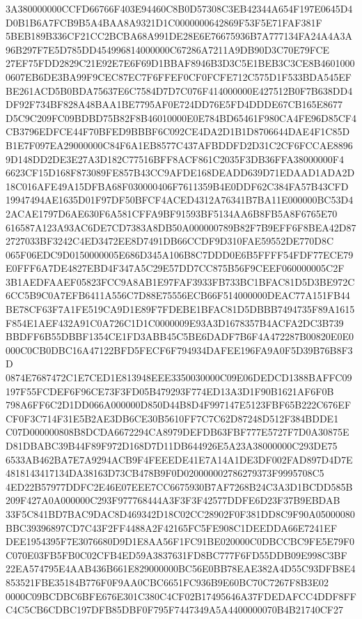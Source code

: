 \documentclass[UTF8,fontset=fandol,zihao=-4,a4paper]{ctexart}
\begin{document}
{{3A380000000CCFD66766F403E94460C8B0D57308C3EB42344A654F197E0645D4D0B1B6A7FCB9B5A4BAA8A9321D1C0000000642869F53F5E71FAF381F
5BEB189B336CF21CC2BCBA68A991DE28E6E76675936B7A777134FA24A4A3A96B297F7E5D785DD454996814000000C67286A7211A9DB90D3C70E79FCE
27EF75FDD2829C21E92E7E6F69D1BBAF8946B3D3C5E1BEB3C3CE8B46010000607EB6DE3BA99F9CEC87EC7F6FFEF0CF0FCFE712C575D1F533BDA545EF
BE261ACD5B0BDA75637E6C7584D7D7C076F414000000E427512B0F7B638DD4DF92F734BF828A48BAA1BE7795AF0E724DD76E5FD4DDDE67CB165E8677
D5C9C209FC09BDBD75B82F8B46010000E0E784BD65461F980CA4FE96D85CF4CB3796EDFCE44F70BFED9BBBF6C092CE4DA2D1B1D8706644DAE4F1C85D
B1E7F097EA29000000C84F6A1EB8577C437AFBDDFD2D31C2CF6FCCAE88969D148DD2DE3E27A3D182C77516BFF8ACF861C2035F3DB36FFA38000000F4
6623CF15D168F873089FE857B43CC9AFDE168DEADD639D71EDAAD1ADA2D18C016AFE49A15DFBA68F030000406F7611359B4E0DDF62C384FA57B43CFD
19947494AE1635D01F97DF50BFCF4ACED4312A76341B7BA11E000000BC53D42ACAE1797D6AE630F6A581CFFA9BF91593BF5134AA6B8FB5A8F6765E70
616587A123A93AC6DE7CD7383A8DB50A000000789B82F7B9EFF6F8BEA42D872727033BF3242C4ED3472EE8D7491DB66CCDF9D310FAE59552DE770D8C
065F06EDC9D0150000005E686D345A106B8C7DDD0E6B5FFFF54FDF77ECE79E0FFF6A7DE4827EBD4F347A5C29E57DD7CC875B56F9CEEF060000005C2F
3B1AEDFAAEF05823FCC9A8AB1E97FAF3933FB733BC1BFAC81D5D3BE972C6CC5B9C0A7EFB6411A556C7D88E75556ECB66F514000000DEAC77A151FB44
BE78CF63F7A1FE519CA9D1E89F7FDEBE1BFAC81D5DBBB7494735F89A1615F854E1AEF432A91C0A726C1D1C0000009E93A3D1678357B4ACFA2DC3B739
BBDFF6B55DBBF1354CE1FD3ABB45C5BE6DADF7B6F4A472287B00820E0E0000C0CB0DBC16A47122BFD5FECF6F794934DAFEE196FA9A0F5D39B76B8F3D
0874E7687472C1E7CED1E813948EEE3350030000C09E06DEDCD1388BAFFC09197F55FCDEF6F96CE73F3FD05B479293F774ED13A3D1F90B1621AF6F0B
798A6FF6C2D1DD066A000000D850D44B8D4F997147E5123FBF65B222C676EFCF0F3C714F31E5B2AE3DB6CE30B5610FF7C7C62D87248D512F384BDDE1
C07D000000808B8DCDA6672294CA8979DEFDB63FBF777E5727F7D0A30875ED81DBABC39B44F89F972D168D7D11DB644926E5A23A38000000C293DE75
6533AB462BA7E7A9294ACB9F4FEEEDE41E7A14A1DE3DF002FAD897D4D7E4818143417134DA38163D73CB478B9F0D020000002786279373F9995708C5
4ED22B57977DDFC2E46E07EEE7CC6675930B7AF7268B24C3A3D1BCDD585B209F427A0A000000C293F977768444A3F3F3F42577DDFE6D23F37B9EBDAB
33F5C841BD7BAC9DAC8D469342D18C02CC28902F0F381DD8C9F90A05000080BBC39396897CD7C43F2FF4488A2F42165FC5FE908C1DEEDDA66E7241EF
DEE1954395F7E3076680D9D1E8AA56F1FC91BE020000C0DBCCBC9FE5E79F0C070E03FB5FB0C02CFB4ED59A3837631FD8BC777F6FD55DDB09E998C3BF
22EA574795E4AAB436B661E829000000BC56E0BB78EAE382A4D55C93DFB8E4853521FBE35184B776F0F9AA0CBC6651FC936B9E60BC70C7267F8B3E02
0000C09BCDBC6BFE676E301C380C4CF02B17495646A37FDEDAFCC4DDF8FFC4C5CB6CDBC197DFB85DBF0F795F7447349A5A4400000070B4B21740CF27
}}
\end{document}
